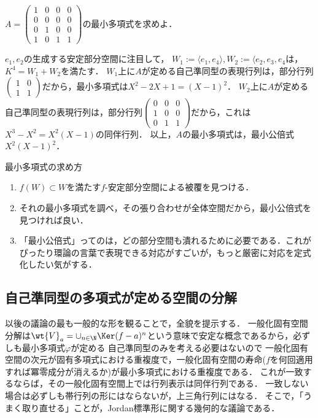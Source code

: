 \documentclass[uplatex, dvipdfmx]{jsreport}
\begin{document}
\begin{problem}
    $A=\begin{pmatrix}1&0&0&0\\0&0&0&0\\0&1&0&0\\1&0&1&1\end{pmatrix}$の最小多項式を求めよ．
\end{problem}
\begin{Proof}[［解答］]
    $e_1,e_2$の生成する安定部分空間に注目して，
    $W_1:=\langle e_1,e_4\rangle,W_2:=\langle e_2,e_3,e_4$は，$K^4=W_1+W_2$を満たす．
    $W_1$上に$A$が定める自己準同型の表現行列は，部分行列$\begin{pmatrix}1&0\\1&1\end{pmatrix}$だから，最小多項式は$X^2-2X+1=(X-1)^2$．
    $W_2$上に$A$が定める自己準同型の表現行列は，部分行列$\begin{pmatrix}0&0&0\\1&0&0\\0&1&1\end{pmatrix}$だから，これは$X^3-X^2=X^2(X-1)$の同伴行列．
    以上，$A$の最小多項式は，最小公倍式$X^2(X-1)^2$．
\end{Proof}

\begin{itembox}[l]{最小多項式の求め方}
    \begin{enumerate}
        \item $f(W)\subset W$を満たす$f$-安定部分空間による被覆を見つける．
        \item それの最小多項式を調べ，その張り合わせが全体空間だから，最小公倍式を見つければ良い．
        \item 「最小公倍式」ってのは，どの部分空間も潰れるために必要である．これがぴったり環論の言葉で表現できる対応がすごいが，もっと厳密に対応を定式化したい気がする．
    \end{enumerate}
\end{itembox}

\subsection{自己準同型の多項式が定める空間の分解}

\begin{tcolorbox}[colframe=ForestGreen, colback=ForestGreen!10!white,breakable,colbacktitle=ForestGreen!40!white,coltitle=black,fonttitle=\bfseries\sffamily,
title=]
    以後の議論の最も一般的な形を観ることで，全貌を提示する．
    一般化固有空間分解は$\wt{V}_{a}=\cup_{n\in\N}\Ker(f-a)^n$という意味で安定な概念であるから，必ずしも最小多項式$\varphi$が定める
    自己準同型のみを考える必要はないので
    一般化固有空間の次元が固有多項式における重複度で，一般化固有空間の寿命($f$を何回適用すれば冪零成分が消えるか)が最小多項式における重複度である．
    これが一致するならば，その一般化固有空間上では行列表示は同伴行列である．
    一致しない場合は必ずしも帯行列の形にはならないが，上三角行列にはなる．
    そこで，「うまく取り直せる」ことが，Jordan標準形に関する幾何的な議論である．
\end{tcolorbox}
\end{document}
